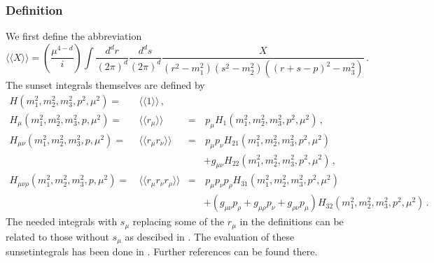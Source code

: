 \documentclass[12pt,a4paper]{article}
\begin{document}
\subsubsection{Definition}

We first define the abbreviation
\begin{equation}
\label{defS}
\langle\langle X \rangle\rangle = 
\left(\frac{\mu^{4-d}}{i}\right)\int \frac{d^d r}{(2\pi)^d} \frac{d^d s}{(2\pi)^d}
 \frac{X}{\left(r^2-m_1^2\right)\left(s^2-m_2^2\right) \left((r+s-p)^2-m_3^2\right) }\,.
\end{equation}
The sunset integrals themselves are defined by
\begin{align}
H(m_1^2,m_2^2,m_3^2,p^2,\mu^2) =\, &
\langle\langle 1 \rangle\rangle\,, &&
\nonumber\\
H_\mu(m_1^2,m_2^2,m_3^2,p,\mu^2) =\, &
\langle\langle r_\mu \rangle\rangle
& = &\,p_\mu H_1(m_1^2,m_2^2,m_3^2,p^2,\mu^2)\,,
\nonumber\\
H_{\mu\nu}(m_1^2,m_2^2,m_3^2,p,\mu^2) =\, &
\langle\langle r_\mu r_\nu\rangle\rangle
&=&\, p_\mu p_\nu H_{21}(m_1^2,m_2^2,m_3^2,p^2,\mu^2)
\nonumber\\ & & &
+g_{\mu\nu} H_{22}(m_1^2,m_2^2,m_3^2,p^2,\mu^2)\,,
\nonumber\\
H_{\mu\nu\rho}(m_1^2,m_2^2,m_3^2,p,\mu^2) =\, &
\langle\langle r_\mu r_\nu r_\rho\rangle\rangle
&=&\, p_\mu p_\nu p_\rho H_{31}(m_1^2,m_2^2,m_3^2,p^2,\mu^2)
\nonumber\\ & & &
+\left(g_{\mu\nu}p_\rho+g_{\mu\rho}p_\nu+g_{\rho\nu}p_\mu\right)
 H_{32}(m_1^2,m_2^2,m_3^2,p^2,\mu^2)\,.
\end{align}
The needed integrals with $s_\mu$ replacing some of the $r_\mu$ in the
definitions can be related to those without $s_\mu$ as descibed in
\cite{Amoros:1999dp}.
The evaluation of these sunsetintegrals has been done in
\cite{Amoros:1999dp}. Further references can be found there.
\end{document}
